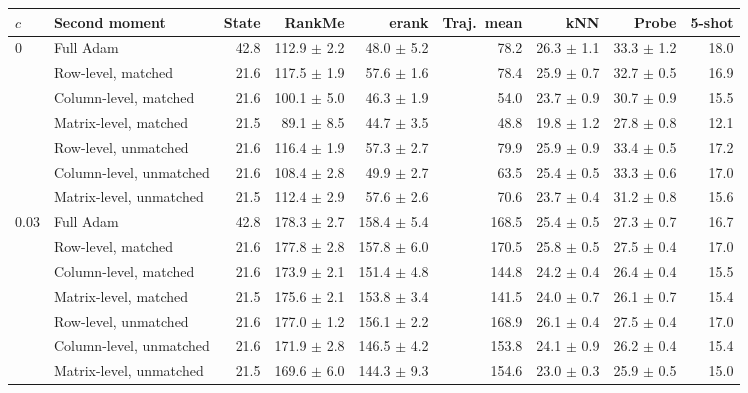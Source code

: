 \begin{tabular}{llrrrrrrr}
\toprule
$c$ & Second moment & State & RankMe & erank & Traj.\ mean & kNN & Probe & 5-shot \\
\midrule
0 & Full Adam & 42.8 & 112.9 $\pm$ 2.2 & 48.0 $\pm$ 5.2 & 78.2 & 26.3 $\pm$ 1.1 & 33.3 $\pm$ 1.2 & 18.0 \\
 & Row-level, matched & 21.6 & 117.5 $\pm$ 1.9 & 57.6 $\pm$ 1.6 & 78.4 & 25.9 $\pm$ 0.7 & 32.7 $\pm$ 0.5 & 16.9 \\
 & Column-level, matched & 21.6 & 100.1 $\pm$ 5.0 & 46.3 $\pm$ 1.9 & 54.0 & 23.7 $\pm$ 0.9 & 30.7 $\pm$ 0.9 & 15.5 \\
 & Matrix-level, matched & 21.5 & 89.1 $\pm$ 8.5 & 44.7 $\pm$ 3.5 & 48.8 & 19.8 $\pm$ 1.2 & 27.8 $\pm$ 0.8 & 12.1 \\
 & Row-level, unmatched & 21.6 & 116.4 $\pm$ 1.9 & 57.3 $\pm$ 2.7 & 79.9 & 25.9 $\pm$ 0.9 & 33.4 $\pm$ 0.5 & 17.2 \\
 & Column-level, unmatched & 21.6 & 108.4 $\pm$ 2.8 & 49.9 $\pm$ 2.7 & 63.5 & 25.4 $\pm$ 0.5 & 33.3 $\pm$ 0.6 & 17.0 \\
 & Matrix-level, unmatched & 21.5 & 112.4 $\pm$ 2.9 & 57.6 $\pm$ 2.6 & 70.6 & 23.7 $\pm$ 0.4 & 31.2 $\pm$ 0.8 & 15.6 \\
\midrule
0.03 & Full Adam & 42.8 & 178.3 $\pm$ 2.7 & 158.4 $\pm$ 5.4 & 168.5 & 25.4 $\pm$ 0.5 & 27.3 $\pm$ 0.7 & 16.7 \\
 & Row-level, matched & 21.6 & 177.8 $\pm$ 2.8 & 157.8 $\pm$ 6.0 & 170.5 & 25.8 $\pm$ 0.5 & 27.5 $\pm$ 0.4 & 17.0 \\
 & Column-level, matched & 21.6 & 173.9 $\pm$ 2.1 & 151.4 $\pm$ 4.8 & 144.8 & 24.2 $\pm$ 0.4 & 26.4 $\pm$ 0.4 & 15.5 \\
 & Matrix-level, matched & 21.5 & 175.6 $\pm$ 2.1 & 153.8 $\pm$ 3.4 & 141.5 & 24.0 $\pm$ 0.7 & 26.1 $\pm$ 0.7 & 15.4 \\
 & Row-level, unmatched & 21.6 & 177.0 $\pm$ 1.2 & 156.1 $\pm$ 2.2 & 168.9 & 26.1 $\pm$ 0.4 & 27.5 $\pm$ 0.4 & 17.0 \\
 & Column-level, unmatched & 21.6 & 171.9 $\pm$ 2.8 & 146.5 $\pm$ 4.2 & 153.8 & 24.1 $\pm$ 0.9 & 26.2 $\pm$ 0.4 & 15.4 \\
 & Matrix-level, unmatched & 21.5 & 169.6 $\pm$ 6.0 & 144.3 $\pm$ 9.3 & 154.6 & 23.0 $\pm$ 0.3 & 25.9 $\pm$ 0.5 & 15.0 \\
\bottomrule
\end{tabular}
